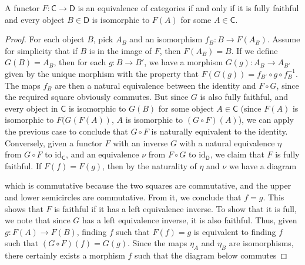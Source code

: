 \begin{theorem}
    A functor $F: \mathsf{C} \to \mathsf{D}$ is an equivalence of categories if and only if it is fully faithful and every object $B \in \mathsf{D}$ is isomorphic to $F(A)$ for some $A \in \mathsf{C}$.
\end{theorem}
\begin{proof}
    For each object $B$, pick $A_B$ and an isomorphism $f_B: B \to F(A_B)$. Assume for simplicity that if $B$ is in the image of $F$, then $F(A_B) = B$. If we define $G(B) = A_B$, then for each $g: B \to B'$, we have a morphism $G(g): A_B \to A_{B'}$ given by the unique morphism with the property that $F(G(g)) = f_{B'} \circ g \circ f_B^{-1}$. The maps $f_B$ are then a natural equivalence between the identity and $F \circ G$, since the required square obviously commutes. But since $G$ is also fully faithful, and every object in $\mathsf{C}$ is isomorphic to $G(B)$ for some object $A \in \mathsf{C}$ (since $F(A)$ is isomorphic to $F(G(F(A))$, $A$ is isomorphic to $(G \circ F)(A)$), we can apply the previous case to conclude that $G \circ F$ is naturally equivalent to the identity. Conversely, given a functor $F$ with an inverse $G$ with a natural equivalence $\eta$ from $G \circ F$ to $\text{id}_{\mathsf{C}}$, and an equivalence $\nu$ from $F \circ G$ to $\text{id}_{\mathsf{D}}$, we claim that $F$ is fully faithful. If $F(f) = F(g)$, then by the naturality of $\eta$ and $\nu$ we have a diagram
    \begin{center}
    \end{center}
    which is commutative because the two squares are commutative, and the upper and lower semicircles are commutative. From it, we conclude that $f = g$. This shows that $F$ is faithful if it has a left equivalence inverse. To show that it is full, we note that since $G$ has a left equivalence inverse, it is also faithful. Thus, given $g: F(A) \to F(B)$, finding $f$ such that $F(f) = g$ is equivalent to finding $f$ such that $(G \circ F)(f) = G(g)$. Since the maps $\eta_A$ and $\eta_B$ are isomorphisms, there certainly exists a morphism $f$ such that the diagram below commutes

\end{proof}
